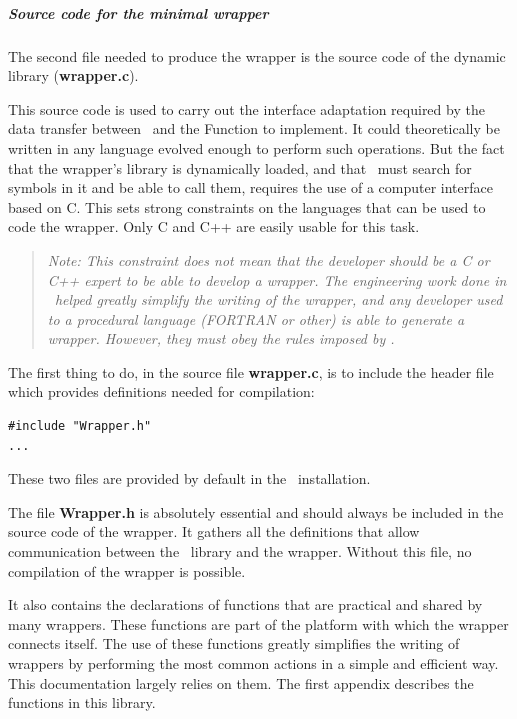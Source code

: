 \subparagraph{Source code for the minimal wrapper}

The second file needed to produce the wrapper is the source code of the dynamic library ({\bf wrapper.c}).

This source code is used to carry out the interface adaptation required by the data transfer between \OT\ and the Function to implement. It could theoretically be written in any language evolved enough to perform such operations. But the fact that the wrapper's library is dynamically loaded, and that \OT\ must search for symbols in it and be able to call them, requires the use of a computer interface based on C. This sets strong constraints on the languages that can be used to code the wrapper. Only C and C++ are easily usable for this task.

\small
\begin{quote}
\textit{Note: This constraint does not mean that the developer should be a C or C++ expert to be able to develop a wrapper. The engineering work done in \OT\ helped greatly simplify the writing of the wrapper, and any developer used to a procedural language (FORTRAN or other) is able to generate a wrapper. However, they must obey the rules imposed by \OT.}
\end{quote}
\normalsize

The first thing to do, in the source file {\bf wrapper.c}, is to include the header file which provides definitions needed for compilation:

\lstset{language=C, basicstyle=\normalsize}
\begin{lstlisting}[frame=TBRL]
#include "Wrapper.h"
...
\end{lstlisting}

These two files are provided by default in the \OT\ installation.

The file {\bf Wrapper.h} is absolutely essential and should always be included in the source code of the wrapper. It gathers all the definitions that allow communication between the \OT\ library and the wrapper. Without this file, no compilation of the wrapper is possible.

It also contains the declarations of functions that are practical and shared by many wrappers. These functions are part of the platform with which the wrapper connects itself. The use of these functions greatly simplifies the writing of wrappers by performing the most common actions in a simple and efficient way. This documentation largely relies on them. The first appendix describes the functions in this library.

